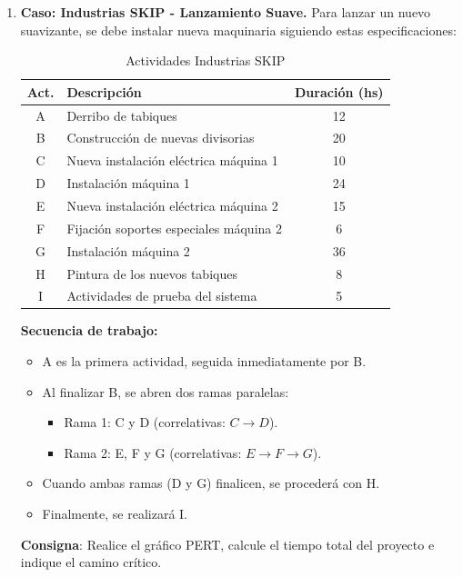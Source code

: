 \documentclass[../main]{subfiles}
\begin{document}
\begin{enumerate}
    \begin{enumerate}
      \item Elabore el gráfico de Gantt.
      \item Elabore el gráfico PERT.
      \item Indique las actividades del camino crítico y el tiempo de
        holgura de cada nodo.
    \end{enumerate}

  \item \textbf{Caso: Industrias SKIP - Lanzamiento Suave.}
    Para lanzar un nuevo suavizante, se debe instalar nueva
    maquinaria siguiendo estas especificaciones:

    \begin{table}[h!]
      \centering
      \begin{tabular}{|c|l|c|} \hline
        \textbf{Act.} & \textbf{Descripción} & \textbf{Duración (hs)}
        \\ \hline \hline
        A & Derribo de tabiques & 12 \\
        B & Construcción de nuevas divisorias & 20 \\
        C & Nueva instalación eléctrica máquina 1 & 10 \\
        D & Instalación máquina 1 & 24 \\
        E & Nueva instalación eléctrica máquina 2 & 15 \\
        F & Fijación soportes especiales máquina 2 & 6 \\
        G & Instalación máquina 2 & 36 \\
        H & Pintura de los nuevos tabiques & 8 \\
        I & Actividades de prueba del sistema & 5 \\ \hline
      \end{tabular}
      \caption{Actividades Industrias SKIP}
      \label{tab:industrias_skip}
    \end{table}

    \textbf{Secuencia de trabajo:}
    \begin{itemize}
      \item A es la primera actividad, seguida inmediatamente por B.
      \item Al finalizar B, se abren dos ramas paralelas:
        \begin{itemize}
          \item Rama 1: C y D (correlativas: $C \rightarrow D$).
          \item Rama 2: E, F y G (correlativas: $E \rightarrow F
            \rightarrow G$).
        \end{itemize}
      \item Cuando ambas ramas (D y G) finalicen, se procederá con H.
      \item Finalmente, se realizará I.
    \end{itemize}

    \textbf{Consigna}: Realice el gráfico PERT, calcule el tiempo
    total del proyecto e indique el camino crítico.
\end{enumerate}
\end{document}
